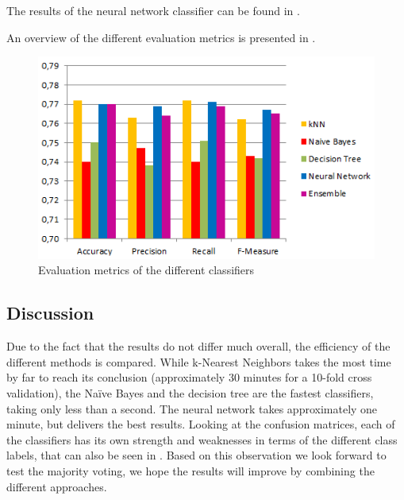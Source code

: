 The results of the neural network classifier can be found in .
\begin{table}[H]
	\centering
	\caption{Confusion matrix of the Neural Network}
	\label{tab:mat-nn}
\end{table}

An overview of the different evaluation metrics is presented in .
\begin{figure}[H]
	\centering
	\includegraphics[width=\columnwidth]{../../charts/results.png}
	\caption{Evaluation metrics of the different classifiers}
	\label{fig:result}
\end{figure}

\subsection{Discussion}
Due to the fact that the results do not differ much overall, the efficiency of the different methods is compared. While k-Nearest Neighbors takes the most time by far to reach its conclusion (approximately 30 minutes for a 10-fold cross validation), the Na\"ive Bayes and the decision tree are the fastest classifiers, taking only less than a second. The neural network takes approximately one minute, but delivers the best results. Looking at the confusion matrices, each of the classifiers has its own strength and weaknesses in terms of the different class labels, that can also be seen in . Based on this observation we look forward to test the majority voting, we hope the results will improve by combining the different approaches. 

